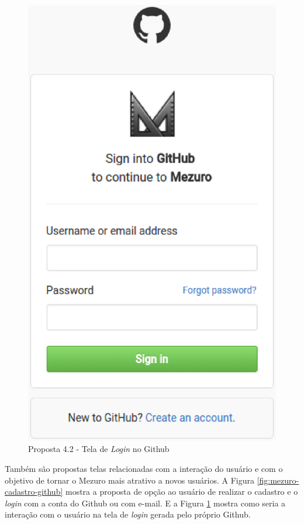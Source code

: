 \begin{figure}[!htb]
	\centering
    \includegraphics[keepaspectratio=true,scale=0.5]
    {figuras/singup_mezuro_github.eps}
  \caption{Proposta 4.2 - Tela de \textit{Login} no Github}
  \label{fig:singup_mezuro_github}
\end{figure}

Também  são propostas telas relacionadas com a interação do usuário e com o
objetivo de tornar o Mezuro mais atrativo a novos usuários.
%
A Figura \ref{fig:mezuro-cadastro-github} mostra a proposta de opção ao usuário
de realizar o cadastro e o \textit{login} com a conta do Github ou com e-mail.
E a Figura \ref{fig:singup_mezuro_github} mostra como seria a interação com o
usuário na tela de \textit{login} gerada pelo próprio Github.

